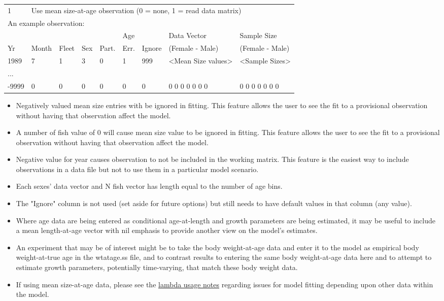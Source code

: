 \begin{center}
	\begin{tabular}{p{0.75cm} p{1cm} p{0.75cm} p{1cm} p{0.75cm} p{1cm} p{1cm} p{3.2cm} p{3.2cm} }
		\hline
		1 & \multicolumn{8}{l}{Use mean size-at-age observation (0 = none, 1 = read data matrix)} \Tstrut\\
		\multicolumn{9}{l}{An example observation:}\Bstrut\\
		\hline
		   &       &       &     &       & Age  &        & Data Vector     & Sample Size \Tstrut\\
		Yr & Month & Fleet & Sex & Part. & Err. & Ignore & (Female - Male) & (Female - Male) \Bstrut\\
		\hline
		1989  & 7 & 1 & 3 & 0 & 1 & 999 & <Mean Size values> & <Sample Sizes> \Tstrut\\
		...   &   &   &   &   &   &   &  & \\
		-9999 & 0 & 0 & 0 & 0 & 0 & 0 &  0 0 0 0 0 0 0 & 0 0 0 0 0 0 0 \Bstrut\\
		\hline
	\end{tabular}
\end{center}


	\begin{itemize}
		\item Negatively valued mean size entries with be ignored in fitting. This
		feature allows the user to see the fit to a provisional observation without having that
		observation affect the model.
		\item A number of fish value of 0 will cause mean size value to be ignored in fitting. This
		feature allows the user to see the fit to a provisional observation without having that
		observation affect the model.
		\item Negative value for year causes observation to not be included in the working matrix. This feature is the easiest way to include observations in a data file but not to use them in a
		particular model scenario.
		\item Each sexes' data vector and N fish vector has length equal to the number of age bins.
		\item The "Ignore" column is not used (set aside for future options) but still needs to have default values in that column (any value). 
		\item Where age data are being entered as conditional age-at-length and growth parameters are being estimated, it may be useful to include a mean length-at-age vector with nil emphasis to provide another view on the model's estimates.
		\item An experiment that may be of interest might be to take the body weight-at-age data and enter it to the model as empirical body weight-at-true age in the wtatage.ss file, and to contrast results to entering the same body weight-at-age data here and to attempt to estimate growth parameters, potentially time-varying, that match these body weight data.
		\item If using mean size-at-age data, please see the \hyperlink{SaAlambda}{lambda usage notes} regarding issues for model fitting depending upon other data within the model.  		
	\end{itemize}

